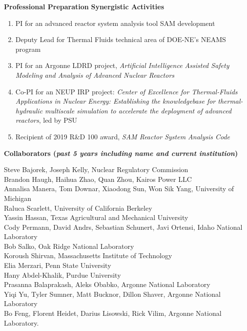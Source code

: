 \documentclass[11pt,letterpaper,english]{article}
\begin{document}
\begin{flushleft} {\bf Professional Preparation}
\vspace{.04in}
{\bf Synergistic Activities}
\vspace{-6pt}
\begin{enumerate} \itemsep1pt \parskip0pt 
\item PI for an advanced reactor system analysis tool SAM development
\item Deputy Lead for Thermal Fluids technical area of DOE-NE’s NEAMS program
\item PI for an Argonne LDRD project, \textit{Artificial Intelligence Assisted Safety Modeling and Analysis of Advanced Nuclear Reactors}
\item Co-PI for an NEUP IRP project: \textit{Center of Excellence for Thermal-Fluids Applications in Nuclear Energy: Establishing the knowledgebase for thermal-hydraulic multiscale simulation to accelerate the deployment of advanced reactors}, led by PSU
\item Recipient of 2019 R\&D 100 award, \textit{SAM Reactor System Analysis Code}
\end{enumerate}

\vspace{-6pt}
{\bf Collaborators ({\emph{past 5 years including name and current institution}})}
{\parindent 16pt

Steve Bajorek, Joseph Kelly, Nuclear Regulatory Commission\\
Brandon Haugh, Haihua Zhao, Quan Zhou, Kairos Power LLC\\
Annalisa Manera, Tom Downar, Xiaodong Sun, Won Sik Yang, University of Michigan\\
Raluca Scarlett, University of California Berkeley\\
Yassin Hassan, Texas Agricultural and Mechanical University\\
Cody Permann, David Andrs, Sebastian Schunert, Javi Ortensi, Idaho National Laboratory\\
Bob Salko, Oak Ridge National Laboratory\\
Koroush Shirvan, Massachusetts Institute of Technology\\
Elia Merzari, Penn State University\\
Hany Abdel-Khalik, Purdue University\\
Prasanna Balaprakash, Aleks Obabko, Argonne National Laboratory\\
Yiqi Yu, Tyler Sumner, Matt Bucknor, Dillon Shaver, Argonne National Laboratory\\
Bo Feng, Florent Heidet, Darius Lisowski, Rick Vilim, Argonne National Laboratory.
}
\end{flushleft}
\end{document}
